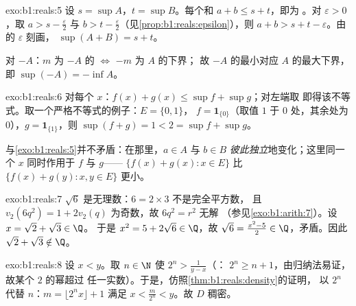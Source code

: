 \begin{solution}{exo:b1:reals:5}
设 $s = \sup A$，$t = \sup B$。每个和 $a + b \leq s + t$，即为
。对 $\varepsilon > 0$，取 $a > s - \frac\varepsilon2$ 与
$b > t - \frac\varepsilon2$（见\cref{prop:b1:reals:epsilon}），则 $a +
b > s + t - \varepsilon$。由的 $\varepsilon$ 刻画，
$\sup(A+B) = s + t$。

对 $-A$：$m$ 为 $-A$ 的 $\iff$ $-m$ 为 $A$ 的下界；
故 $-A$ 的最小对应
$A$ 的最大下界，即 $\sup(-A) = -\inf A$。
\end{solution}

\begin{solution}{exo:b1:reals:6}
对每个 $x$：$f(x) + g(x) \leq \sup f + \sup g$；对左端取
即得该不等式。取一个严格不等式的例子：$E = \{0, 1\}$，
$f = \mathbf{1}_{\{0\}}$（取值 $1$ 于 $0$ 处，其余处为 $0$），$g =
\mathbf{1}_{\{1\}}$，则 $\sup(f + g) = 1 < 2 = \sup f + \sup g$。

与\cref{exo:b1:reals:5}并不矛盾：在那里，$a \in A$ 与 $b
\in B$ \emph{彼此独立}地变化；这里同一个 $x$ 同时作用于 $f$
与 $g$—— $\{f(x) + g(x) : x \in E\}$ 比
 $\{f(x) + g(y) : x, y \in E\}$ 更小。
\end{solution}

\begin{solution}{exo:b1:reals:7}
$\sqrt 6$ 是无理数：$6 = 2 \times 3$ 不是完全平方数，
且 $v_2(6q^2) = 1 + 2v_2(q)$ 为奇数，故 $6q^2 = r^2$ 无解
（参见\cref{exo:b1:arith:7}）。设 $x = \sqrt 2 + \sqrt 3 \in \Q$。
于是 $x^2 = 5 + 2\sqrt 6 \in \Q$，故 $\sqrt 6 = \frac{x^2 - 5}{2} \in
\Q$，矛盾。因此 $\sqrt 2 + \sqrt 3 \notin \Q$。
\end{solution}

\begin{solution}{exo:b1:reals:8}
设 $x < y$。取 $n \in \N$ 使 $2^n > \frac{1}{y - x}$（：
$2^n \geq n + 1$，由归纳法易证，故某个 $2$ 的幂超过
任一实数）。于是，仿照\cref{thm:b1:reals:density}的证明，
以 $2^n$ 代替 $n$：$m = \lfloor 2^n x \rfloor + 1$ 满足 $x <
\frac{m}{2^n} < y$。故 $D$ 稠密。
\end{solution}

